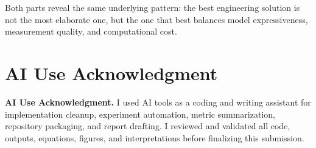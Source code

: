 {Both parts reveal the same underlying pattern: the best engineering solution is
not the most elaborate one, but the one that best balances model expressiveness,
measurement quality, and computational cost.


\section*{AI Use Acknowledgment}
\textbf{AI Use Acknowledgment.} I used AI tools as a coding and writing assistant
for implementation cleanup, experiment automation, metric summarization, repository
packaging, and report drafting.  I reviewed and validated all code, outputs,
equations, figures, and interpretations before finalizing this submission.

}
